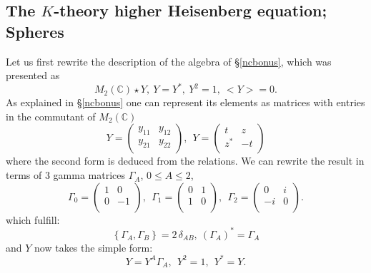 \documentclass[12pt]{article}
\def\C{{\mathbb C}}
\begin{document}
\subsection{The $K$-theory higher Heisenberg equation; Spheres}\label{sectK}

Let us first rewrite the description of the algebra  of \S \ref{ncbonus}, which was presented as $$M_2(\C)\star Y, \  Y=Y^*, \ Y^2=1,\  <Y>=0.$$
As explained in  \S \ref{ncbonus} one can represent its elements as matrices with entries in the commutant of $M_2(\C)$ 
$$
Y=\left(
\begin{array}{cc}
 y_{11} & y_{12} \\
 y_{21} & y_{22} \\
\end{array}
\right)
,\ \ 
Y=\left(
\begin{array}{cc}
 t & z \\
 z^* & -t \\
\end{array}
\right)
$$
where the second form is deduced from the relations. We can rewrite the result in terms of 
$3$   gamma matrices $\Gamma_{A}$, $0\leq A\leq
2$,
$$
\Gamma_{0}=\left(
\begin{array}{cc}
 1 & 0 \\
 0 & -1 \\
\end{array}
\right), \ \ \Gamma_{1}=\left(
\begin{array}{cc}
 0 & 1 \\
 1 & 0 \\
\end{array}
\right), \ \ \Gamma_{2}=\left(
\begin{array}{cc}
 0 & i \\
 -i & 0 \\
\end{array}
\right).
$$
which fulfill:
\[
\left\{  \Gamma_{A},\Gamma_{B}\right\}
=2\,\delta_{AB},\ (\Gamma_{A})^{\ast}=\Gamma_{A}%
\]
and $Y$ now takes the simple form:
$$
Y=Y^{A}\Gamma_{A},\ \ Y^{2}=1,\ \ Y^{\ast}= Y.
$$
\end{document}
